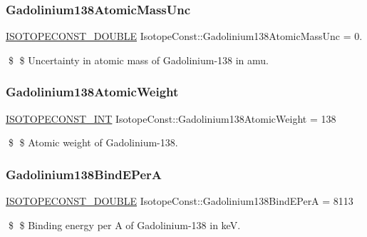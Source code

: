 \subsubsection{\texorpdfstring{Gadolinium138\+Atomic\+Mass\+Unc}{Gadolinium138AtomicMassUnc}}
{\footnotesize\ttfamily \mbox{\hyperlink{group___isotope_const-_macros_ga8f45a7272ce02c0b4c65c44636ed719a}{I\+S\+O\+T\+O\+P\+E\+C\+O\+N\+S\+T\+\_\+\+D\+O\+U\+B\+LE}} Isotope\+Const\+::\+Gadolinium138\+Atomic\+Mass\+Unc = 0.}

\$ \$ Uncertainty in atomic mass of Gadolinium-\/138 in amu. \mbox{\label{group___isotope_const-_gadolinium-_gd138_ga7a5607f75bf66f69ae44259bb943df29}} 
\subsubsection{\texorpdfstring{Gadolinium138\+Atomic\+Weight}{Gadolinium138AtomicWeight}}
{\footnotesize\ttfamily \mbox{\hyperlink{group___isotope_const-_macros_ga5f18360b3e99483a35c32d789e62621c}{I\+S\+O\+T\+O\+P\+E\+C\+O\+N\+S\+T\+\_\+\+I\+NT}} Isotope\+Const\+::\+Gadolinium138\+Atomic\+Weight = 138}

\$ \$ Atomic weight of Gadolinium-\/138. \mbox{\label{group___isotope_const-_gadolinium-_gd138_gaa9a341c22c6aa35d46ac443f5d31813b}} 
\subsubsection{\texorpdfstring{Gadolinium138\+Bind\+E\+PerA}{Gadolinium138BindEPerA}}
{\footnotesize\ttfamily \mbox{\hyperlink{group___isotope_const-_macros_ga8f45a7272ce02c0b4c65c44636ed719a}{I\+S\+O\+T\+O\+P\+E\+C\+O\+N\+S\+T\+\_\+\+D\+O\+U\+B\+LE}} Isotope\+Const\+::\+Gadolinium138\+Bind\+E\+PerA = 8113}

\$ \$ Binding energy per A of Gadolinium-\/138 in keV. \mbox{\label{group___isotope_const-_gadolinium-_gd138_gad4cb21d00b5a4d6cb485892aed97072f}} 
